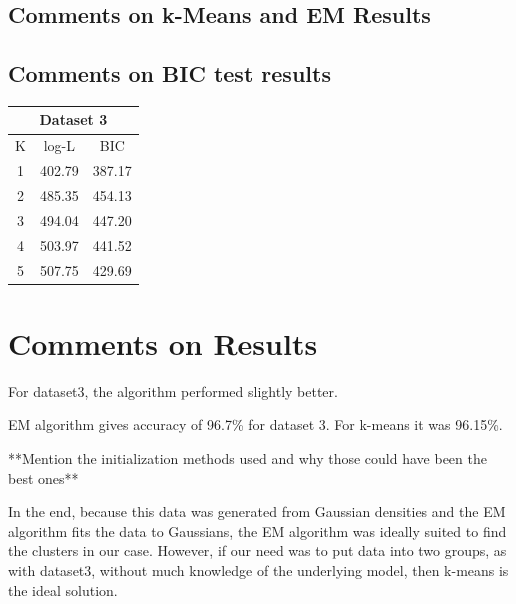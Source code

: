 \documentclass[11pt,psfig]{article}
\begin{document}
\subsection{Comments on k-Means and EM Results}

\subsection{Comments on BIC test results}

\begin{table}[H]
  \centering
  \begin{tabular}{|c|c|c|}
    \hline
    \multicolumn{3}{|c|}{Dataset 3} \\\hline
    K & log-L & BIC \\\hline
    1 & 402.79 & 387.17 \\
		2 & 485.35 & 454.13 \\
		3 & 494.04 & 447.20 \\
		4 & 503.97 & 441.52 \\
    5 & 507.75 & 429.69 \\\hline
  \end{tabular}
\end{table}

\section{Comments on Results}

  For dataset3, the algorithm performed slightly better. 

EM algorithm gives accuracy of 96.7\% for dataset 3. For k-means it was 96.15\%. 

**Mention the initialization methods used and why those could have been the best ones**

In the end, because this data was generated from Gaussian densities and the EM algorithm fits the data to Gaussians, the EM algorithm was ideally suited to find the clusters in our case. However, if our need was to put data into two groups, as with dataset3, without much knowledge of the underlying model, then k-means is the ideal solution. 
\end{document}
